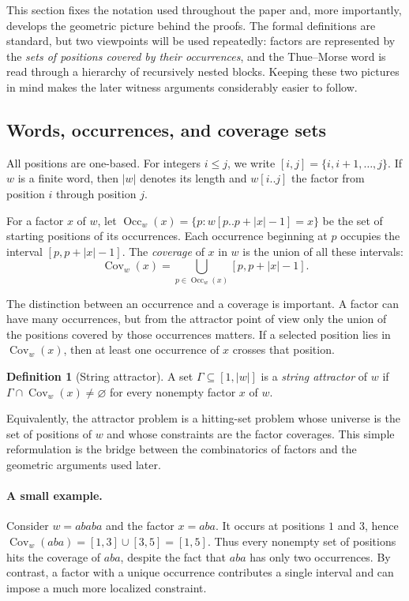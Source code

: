 \documentclass[10pt,a4paper]{article}
\theoremstyle{definition}\newtheorem{definition}[theorem]{Definition}
\theoremstyle{remark}\newtheorem{remark}[theorem]{Remark}
\newcommand{\Occ}{\operatorname{Occ}}
\newcommand{\Cov}{\operatorname{Cov}}
\begin{document}
This section fixes the notation used throughout the paper and, more importantly, develops the geometric picture behind the proofs. The formal definitions are standard, but two viewpoints will be used repeatedly: factors are represented by the \emph{sets of positions covered by their occurrences}, and the Thue--Morse word is read through a hierarchy of recursively nested blocks. Keeping these two pictures in mind makes the later witness arguments considerably easier to follow.

\subsection{Words, occurrences, and coverage sets}
All positions are one-based. For integers $i\le j$, we write
$
[i,j]=\{i,i+1,\ldots,j\}.
$
If $w$ is a finite word, then $|w|$ denotes its length and $w[i..j]$ the factor from position $i$ through position $j$.

For a factor $x$ of $w$, let
$
\Occ_w(x)=\{p:w[p..p+|x|-1]=x\}
$
be the set of starting positions of its occurrences. Each occurrence beginning at $p$ occupies the interval
$
[p,p+|x|-1].
$
The \emph{coverage} of $x$ in $w$ is the union of all these intervals:
\begin{equation}
\Cov_w(x)=\bigcup_{p\in\Occ_w(x)}[p,p+|x|-1].
\label{eq:coverage-definition}
\end{equation}

The distinction between an occurrence and a coverage is important. A factor can have many occurrences, but from the attractor point of view only the union of the positions covered by those occurrences matters. If a selected position lies in $\Cov_w(x)$, then at least one occurrence of $x$ crosses that position.

\begin{definition}[String attractor]
A set $\Gamma\subseteq[1,|w|]$ is a \emph{string attractor} of $w$ if
$
\Gamma\cap\Cov_w(x)\neq\varnothing
$
for every nonempty factor $x$ of $w$.
\end{definition}

Equivalently, the attractor problem is a hitting-set problem whose universe is the set of positions of $w$ and whose constraints are the factor coverages. This simple reformulation is the bridge between the combinatorics of factors and the geometric arguments used later.

\paragraph{A small example.}
Consider $w=ababa$ and the factor $x=aba$. It occurs at positions $1$ and $3$, hence
$
\Cov_w(aba)=[1,3]\cup[3,5]=[1,5].
$
Thus every nonempty set of positions hits the coverage of $aba$, despite the fact that $aba$ has only two occurrences. By contrast, a factor with a unique occurrence contributes a single interval and can impose a much more localized constraint.
\end{document}
